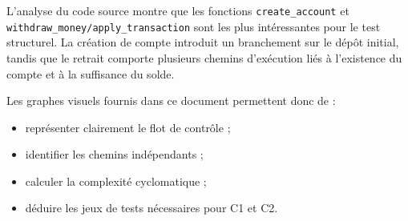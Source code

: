 \documentclass[11pt,a4paper]{article}
\begin{document}
L'analyse du code source montre que les fonctions \texttt{create\_account} et \texttt{withdraw\_money/apply\_transaction} sont les plus intéressantes pour le test structurel. La création de compte introduit un branchement sur le dépôt initial, tandis que le retrait comporte plusieurs chemins d'exécution liés à l'existence du compte et à la suffisance du solde.

Les graphes visuels fournis dans ce document permettent donc de :
\begin{itemize}[leftmargin=1cm]
    \item représenter clairement le flot de contrôle ;
    \item identifier les chemins indépendants ;
    \item calculer la complexité cyclomatique ;
    \item déduire les jeux de tests nécessaires pour C1 et C2.
\end{itemize}
\end{document}
